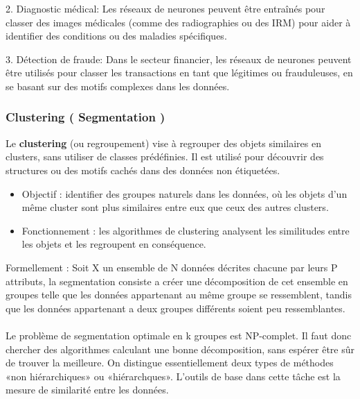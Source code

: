 \documentclass[a4paper,12pt]{article}
\begin{document}
        2. Diagnostic médical: Les réseaux de neurones peuvent être entraînés pour classer des images médicales (comme des radiographies ou des IRM) pour aider à identifier des conditions ou des maladies spécifiques.
        
        3. Détection de fraude: Dans le secteur financier, les réseaux de neurones peuvent être utilisés pour classer les transactions en tant que légitimes ou frauduleuses, en se basant sur des motifs complexes dans les données.

        


        \subsubsection{Clustering ( Segmentation )}
        
        Le \textbf{clustering} (ou regroupement) vise à regrouper des objets similaires en clusters, sans utiliser de classes prédéfinies. Il est utilisé pour découvrir des structures ou des motifs cachés dans des données non étiquetées.
        
        
        \begin{itemize}
            \item  Objectif : identifier des groupes naturels dans les données, où les objets d’un même cluster sont plus similaires entre eux que ceux des autres clusters.
            \item  Fonctionnement : les algorithmes de clustering analysent les similitudes entre les objets et les regroupent en conséquence.\\
        \end{itemize}
        Formellement : Soit X un ensemble de N données décrites chacune par leurs P
        attributs, la segmentation consiste a créer une décomposition de cet ensemble
        en groupes telle que les données appartenant au même groupe se ressemblent,
        tandis que les données appartenant a deux groupes différents soient peu
        ressemblantes.{\\}{\\}
        Le problème de segmentation optimale en k groupes est NP-complet. Il faut
        donc chercher des algorithmes calculant une bonne décomposition, sans
        espérer être sûr de trouver la meilleure. On distingue essentiellement deux 
        types de méthodes «non hiérarchiques» ou «hiérarchques».
        L’outils de base dans cette tâche est la mesure de similarité entre les données.
        
\end{document}
